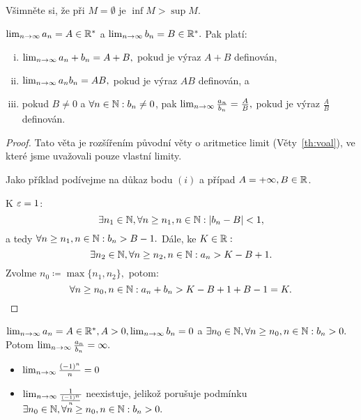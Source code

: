 \begin{remark}
    Všimněte si, že při $M = \emptyset$ je $\inf M > \sup M.$
\end{remark}

\begin{theorem}
    \Necht $\lim_{n\to\infty} a_n = A\in\mathbb{R}^*$ a $\lim_{n\to\infty} b_n = B \in \mathbb{R}^*.$
    Pak platí:
    \begin{enumerate}[i.]
        \item $\lim_{n\to\infty} a_n + b_n = A + B,$ pokud je výraz $A+B$ definován,
        \item $\lim_{n\to\infty} a_nb_n = AB,$ pokud je výraz $AB$ definován, a
        \item pokud $B \neq 0$ a $\forall n \in \mathbb{N}: b_n \neq 0$, pak
            $\lim_{n\to\infty} \frac{a_n}{b_n} = \frac{A}{B},$ pokud je výraz 
            $\frac{A}{B}$ definován.
    \end{enumerate}
\end{theorem}

\begin{proof}
    Tato věta je rozšířením původní věty o aritmetice limit (Věty~\ref{th:voal}), 
    ve které jsme uvažovali pouze vlastní limity. 

    Jako příklad podívejme na důkaz bodu $(i)$ a případ $A = +\infty, B \in \mathbb{R}$.

    K $\varepsilon = 1$:
    $$\exists n_1 \in \mathbb{N}, \forall n \geq n_1, n \in \mathbb{N}: |b_n - B| < 1,$$ 
    a tedy $\forall n \geq n_1, n \in \mathbb{N}: b_n > B - 1.$ Dále, ke $K \in \mathbb{R}:$
    $$\exists n_2 \in \mathbb{N}, \forall n \geq n_2, n\in\mathbb{N}: a_n > K - B + 1.$$
    Zvolme $n_0 \coloneqq \max\{n_1, n_2\},$ potom:
    $$\forall n \geq n_0, n\in\mathbb{N}: a_n + b_n > K -B +1 +B -1 = K.$$
\end{proof}

\begin{theorem}
    \Necht $\lim_{n\to\infty} a_n = A \in \mathbb{R}^*, A > 0, \lim_{n\to\infty} b_n = 0$
    a $\exists n_0 \in \mathbb{N}, \forall n \geq n_0, n \in \mathbb{N}: b_n > 0.$ Potom 
    $\lim_{n\to\infty} \frac{a_n}{b_n} = \infty.$
\end{theorem}

\begin{remark}
    \leavevmode
    \begin{itemize}
        \item $\lim_{n\to\infty} \frac{(-1)^n}{n} = 0$
        \item $\lim_{n\to\infty} \frac{1}{\frac{(-1)^n}{n}}$ neexistuje,
            jelikož porušuje podmínku $\exists n_0 \in \mathbb{N}, \forall n \geq 
            n_0, n \in \mathbb{N}: b_n > 0.$
    \end{itemize}
\end{remark}

